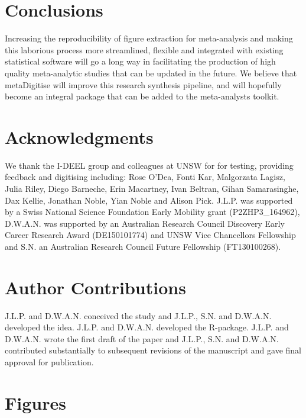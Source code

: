 \documentclass[12pt]{article}
\newcommand{\pkg}[1]{{\fontseries{b}\selectfont #1}}
\begin{document}




\section{Conclusions}
Increasing the reproducibility of figure extraction for meta-analysis and making this laborious process more streamlined, flexible and integrated with existing statistical software will go a long way in facilitating the production of high quality meta-analytic studies that can be updated in the future. We believe that \pkg{metaDigitise} will improve this research synthesis pipeline, and will hopefully become an integral package that can be added to the meta-analysts toolkit.


\section*{Acknowledgments}
We thank the I-DEEL group and colleagues at UNSW for for testing, providing feedback and digitising including: Rose O'Dea, Fonti Kar, Malgorzata Lagisz, Julia Riley, Diego Barneche, Erin Macartney, Ivan Beltran, Gihan Samarasinghe, Dax Kellie, Jonathan Noble, Yian Noble and Alison Pick. J.L.P. was supported by a Swiss National Science Foundation Early Mobility grant (P2ZHP3\_164962), D.W.A.N. was supported by an Australian Research Council Discovery Early Career Research Award (DE150101774) and UNSW Vice Chancellors Fellowship and S.N. an Australian Research Council Future Fellowship (FT130100268). 

\section*{Author Contributions}
J.L.P. and D.W.A.N. conceived the study and J.L.P., S.N. and D.W.A.N. developed the idea. J.L.P. and D.W.A.N. developed the R-package. J.L.P. and D.W.A.N. wrote the first draft of the paper and J.L.P., S.N. and D.W.A.N. contributed substantially to subsequent revisions of the manuscript and gave final approval for publication.






\section*{Figures}
\end{document}
